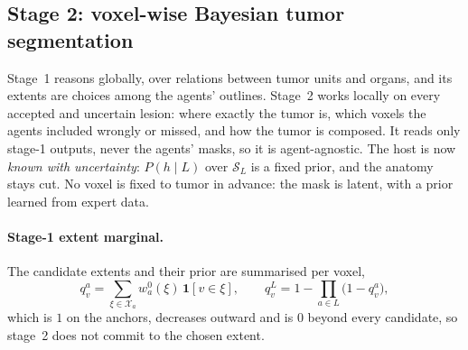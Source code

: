 \documentclass[fleqn,10pt]{olplainarticle}
\begin{document}
\subsection{Stage 2: voxel-wise Bayesian tumor segmentation}
\label{sec:stage2}
Stage~1 reasons globally, over relations between tumor units and organs, and its extents are choices among the agents'
outlines. Stage~2 works locally on every accepted and uncertain lesion: where exactly the tumor is, which voxels the agents
included wrongly or missed, and how the tumor is composed. It reads only stage-1 outputs, never the agents' masks, so it is
agent-agnostic. The host is now \emph{known with uncertainty}: $P(h\mid L)$ over $\mathcal{S}_L$ is a fixed prior, and the
anatomy stays cut. No voxel is fixed to tumor in advance: the mask is latent, with a prior learned from expert data.

\paragraph{Stage-1 extent marginal.} The candidate extents and their prior are summarised per voxel,
\begin{equation}
\label{eq:qv}
q^a_v=\sum_{\xi\in\mathcal{X}_a}w^0_a(\xi)\,\mathbf{1}[v\in\xi],\qquad
q^L_v=1-\prod_{a\in L}\bigl(1-q^a_v\bigr),
\end{equation}
which is $1$ on the anchors, decreases outward and is $0$ beyond every candidate, so stage~2 does not commit to the chosen
extent.

\end{document}
